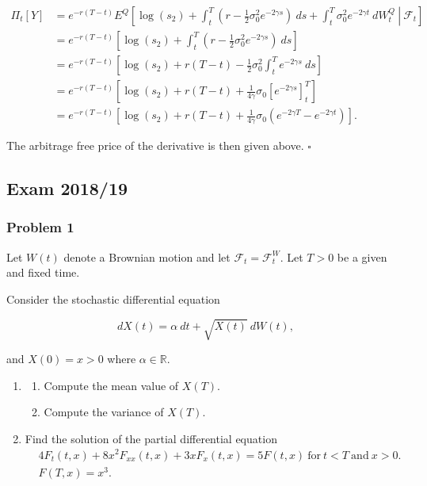 \documentclass[
]{article}
\providecommand{\tightlist}{%
  \setlength{\itemsep}{0pt}\setlength{\parskip}{0pt}}
\begin{document}
\begin{align*}
\Pi_t[Y]&=e^{-r(T-t)}E^Q\left[\left.\log(s_2)+\int_t^T\left(r-\frac{1}{2}\sigma_0^2e^{-2\gamma s}\right)\ ds + \int_t^T \sigma_0^2e^{-2\gamma t}\ dW^Q_t\ \right\vert\ \mathcal{F}_t\right]\\
&=e^{-r(T-t)}\left[\log(s_2)+\int_t^T\left(r-\frac{1}{2}\sigma_0^2e^{-2\gamma s}\right)\ ds\right]\\
&=e^{-r(T-t)}\left[\log(s_2)+r(T-t)-\frac{1}{2}\sigma_0^2\int_t^Te^{-2\gamma s}\ ds\right]\\
&=e^{-r(T-t)}\left[\log(s_2)+r(T-t)+\frac{1}{4\gamma}\sigma_0\left[e^{-2\gamma s}\right]_t^T\right]\\
&=e^{-r(T-t)}\left[\log(s_2)+r(T-t)+\frac{1}{4\gamma}\sigma_0(e^{-2\gamma T}-e^{-2\gamma t})\right].
\end{align*}

The arbitrage free price of the derivative is then given above.
\(\square\)

\hypertarget{exam-201819}{%
\subsection{Exam 2018/19}\label{exam-201819}}

\hypertarget{problem-1-1}{%
\subsubsection{Problem 1}\label{problem-1-1}}

Let \(W(t)\) denote a Brownian motion and let
\(\mathcal{F}_t=\mathcal{F}_t^W\). Let \(T>0\) be a given and fixed
time.

Consider the stochastic differential equation

\[
dX(t)=\alpha\ dt+\sqrt{X(t)}\ dW(t),
\]

and \(X(0)=x>0\) where \(\alpha\in\mathbb{R}\).

\begin{enumerate}
\def\labelenumi{\alph{enumi}.}
\item
  \begin{enumerate}
  \def\labelenumii{\roman{enumii}.}
  \tightlist
  \item
    Compute the mean value of \(X(T)\).
  \item
    Compute the variance of \(X(T)\).
  \end{enumerate}
\item
  Find the solution of the partial differential equation \begin{align*}
    &4F_t(t,x)+8x^2F_{xx}(t,x)+3xF_x(t,x)=5F(t,x)\ \text{for}\ t<T\ \text{and}\ x>0.\\
    &F(T,x)=x^3.
    \end{align*}
\end{enumerate}
\end{document}
